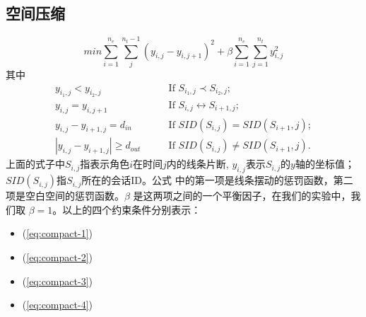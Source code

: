 \subsection{空间压缩} 
\begin{equation}
min \sum_{i=1}^{n_e} \sum_j^{n_t-1} \left(y_{i,j} - y_{i, j+1} \right)^2 + \beta \sum_{i=1}^{n_e} \sum_{j=1}^{n_t} y_{i,j}^2
\end{equation}
\label{eq:compact}
其中
\begin{subequations}
\begin{align}
	y_{i_1,j} < y_{i_2, j} & \qquad \text{If  } S_{i_1,j} \prec S_{i_2,j}; \label{eq:compact-1}\\
	y_{i,j} = y_{i,j+1} & \qquad \text{If  } S_{i,j} \leftrightarrow S_{i+1, j}; \label{eq:compact-2}\\
	y_{i,j} - y_{i+1,j} = d_{in} & \qquad \text{If  } SID(S_{i,j}) = SID(S_{i+1}, j); \label{eq:compact-3}\\
	\left|y_{i,j} - y_{i+1,j}\right| \geq d_{out} & \qquad \text{If  } SID(S_{i,j}) \neq SID(S_{i+1}, j). \label{eq:compact-4}
\end{align}
\end{subequations}
上面的式子中$S_{i,j}$指表示角色$i$在时间$j$内的线条片断, $y_{i,j}$表示$S_{i,j}$的$y$轴的坐标值；$SID(S_{i,j})$指$S_{i,j}$所在的会话ID。公式 \label{eq:compact} 中的第一项是线条摆动的惩罚函数，第二项是空白空间的惩罚函数。$\beta$ 是这两项之间的一个平衡因子，在我们的实验中，我们取 $\beta = 1$。以上的四个约束条件分别表示：
\begin{itemize}
\item (\ref{eq:compact-1}) 
\item (\ref{eq:compact-2})
\item (\ref{eq:compact-3})
\item (\ref{eq:compact-4})
\end{itemize}











